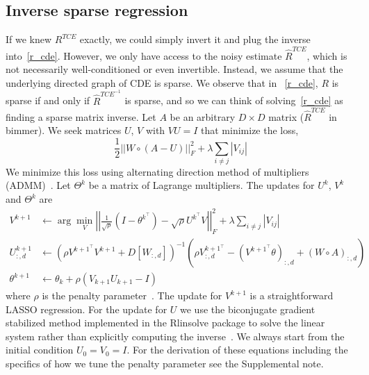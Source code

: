 \documentclass{article}
\begin{document}
\subsection{Inverse sparse regression}
If we knew $R^{TCE}$ exactly, we could simply invert it and plug the inverse
into~\eqref{r_cde}. However, we only have access to the noisy estimate $\hat{R}^{TCE}$,
which is not necessarily well-conditioned or even invertible. Instead, we assume that
the underlying directed graph of CDE is sparse. We observe that in ~\eqref{r_cde}, $R$ is
sparse if and only if $\hat{R}^{TCE^{-1}}$ is sparse, and so we can think of
solving~\eqref{r_cde} as finding a sparse matrix inverse. Let $A$ be an arbitrary $D\times D$
matrix ($\hat{R}^{TCE}$ in bimmer). We seek matrices $U$, $V$ with $VU=I$ that minimize the loss,
\begin{equation}\label{opt_methods}
\frac{1}{2} ||W \circ (A - U)||_F^2 + \lambda \sum_{i\neq j}|V_{ij}|
\end{equation}
We minimize this loss using alternating direction method of multipliers (ADMM)~\cite{Boyd2010}.
Let $\Theta^k$ be a matrix of Lagrange multipliers. The updates for $U^k$, $V^k$ and $\Theta^k$
are
\begin{align}
V^{k+1} &\leftarrow \arg \min_{V} \left|\left|\frac{1}{\sqrt{\rho}}\left(I-\theta^{k^\top}\right) -
      \sqrt{\rho} U^{k^\top} V\right|\right|_F^2 + \lambda \sum_{i\neq j} \left|V_{ij} \right| \\
U_{:, d}^{k+1} &\leftarrow \left(\rho V^{k+1 ^ \top} V^{k+1} + D[W_{:, d}]\right)^{-1} \left(\rho V^{k+1 ^ \top}_{:, d} -
  \left(V^{k+1 ^ \top} \theta\right)_{:, d} + (W \circ A)_{:, d}\right) \\
\theta^{k+1} &\leftarrow \theta_{k} + \rho(V_{k+1}U_{k+1}-I)
\end{align}
where $\rho$ is the penalty parameter~\cite{Boyd2010}.
The update for $V^{k+1}$ is a straightforward LASSO regression. For the update for $U$ 
we use the biconjugate gradient stabilized method implemented
in the Rlinsolve package to solve the linear system
rather than explicitly computing the inverse~\cite{You2018}.
We always start from the initial condition $U_0 = V_0 = I$.
 For the derivation of these equations including
the specifics of how we tune
the penalty parameter see the Supplemental note.
\end{document}
